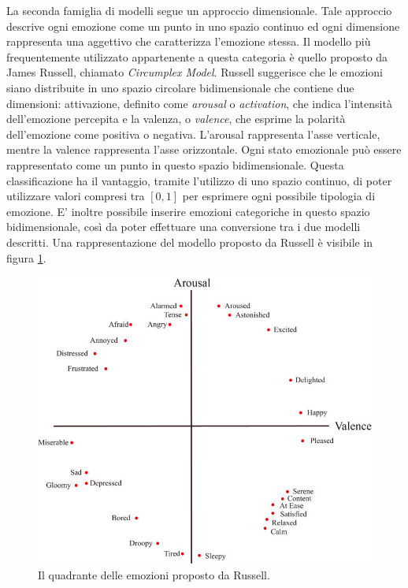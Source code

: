 \documentclass[11pt]{report}
\begin{document}

La seconda famiglia di modelli segue un approccio dimensionale. Tale approccio descrive ogni emozione come un punto in uno spazio continuo ed ogni dimensione rappresenta una aggettivo che caratterizza l'emozione stessa. Il modello più frequentemente utilizzato appartenente a questa categoria è quello proposto da James Russell\cite{Russel}, chiamato \textit{Circumplex Model}. Russell suggerisce che le emozioni siano distribuite in uno spazio circolare bidimensionale che contiene due dimensioni: attivazione, definito come \textit{arousal} o \textit{activation}, che indica l'intensità dell'emozione percepita e la valenza, o \textit{valence}, che esprime la polarità dell'emozione come positiva o negativa. L'arousal rappresenta l'asse verticale, mentre la valence rappresenta l'asse orizzontale. Ogni stato emozionale può essere rappresentato come un punto in questo spazio bidimensionale. Questa classificazione ha il vantaggio, tramite l'utilizzo di uno spazio continuo, di poter utilizzare valori compresi tra $[0,1]$ per esprimere ogni possibile tipologia di emozione. E' inoltre possibile inserire emozioni categoriche in questo spazio bidimensionale, così da poter effettuare una conversione tra i due modelli descritti. Una rappresentazione del modello proposto da Russell è visibile in figura \ref{fig:russell}.


\begin{figure}[h]
    \centering
    \includegraphics[scale = 0.38]{img/Russells-circumplex.jpg}
    \caption{Il quadrante delle emozioni proposto da Russell. \cite{seo2019automatic}}
    \label{fig:russell}
\end{figure}
\end{document}
